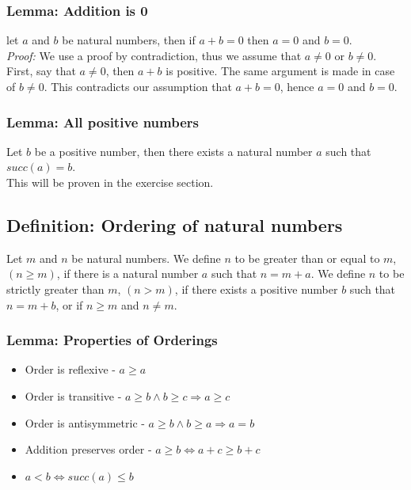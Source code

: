 \documentclass[]{scrbook}
\begin{document}
\subsubsection*{Lemma: Addition is 0}
let $a$ and $b$ be natural numbers, then if $a + b = 0$ then $a = 0$ and $b = 0$.\\
\textit{Proof:} We use a proof by contradiction, thus we assume that $a \neq 0$ or $b \neq 0$. First, say that $a \neq 0$, then $a + b$ is positive. The same argument is made in case of $b \neq 0$. This contradicts our assumption that $a+b=0$, hence $a = 0$ and $b = 0$.

\subsubsection*{Lemma: All positive numbers}
Let $b$ be a positive number, then there exists a natural number $a$ such that $succ(a) = b$.\\
This will be proven in the exercise section.

\subsection{Definition: Ordering of natural numbers}
Let $m$ and $n$ be natural numbers. We define $n$ to be greater than or equal to $m$, $(n\geqslant m)$, if there is a natural number $a$ such that $n = m + a$. We define $n$ to be strictly greater than $m$, $(n>m)$, if there exists a positive number $b$ such that $n = m + b$, or if $n \geqslant m$ and $n \neq m$.

\subsubsection*{Lemma: Properties of Orderings}
\begin{itemize}
	\item[] Order is reflexive - $a\geqslant a$
	\item[] Order is transitive - $a\geqslant b \wedge b\geqslant c \Rightarrow a\geqslant c$
	\item[] Order is antisymmetric - $a \geqslant b \wedge b \geqslant a \Rightarrow a = b$
	\item[] Addition preserves order - $a \geqslant b \Leftrightarrow a + c \geqslant b + c$
	\item[] $a < b \Leftrightarrow succ(a) \leqslant b$
\end{itemize}
\end{document}

